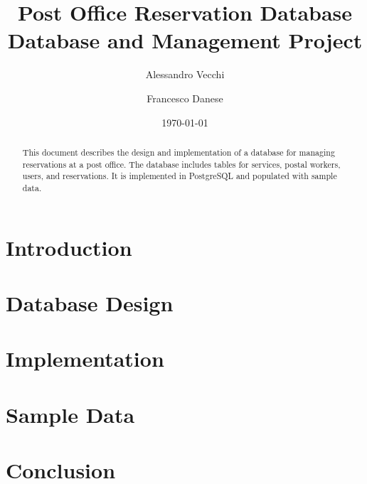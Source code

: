 \documentclass{article}
\title{Post Office Reservation Database \\ \large Database and Management Project}
\author{Alessandro Vecchi \and Francesco Danese}
\date{\today}
\begin{document}
\maketitle

\begin{abstract}
This document describes the design and implementation of a database for managing reservations at a post office. The database includes tables for services, postal workers, users, and reservations. It is implemented in PostgreSQL and populated with sample data.
\end{abstract}

\section{Introduction}

\section{Database Design}

\section{Implementation}

\section{Sample Data}

\section{Conclusion}
\end{document}
